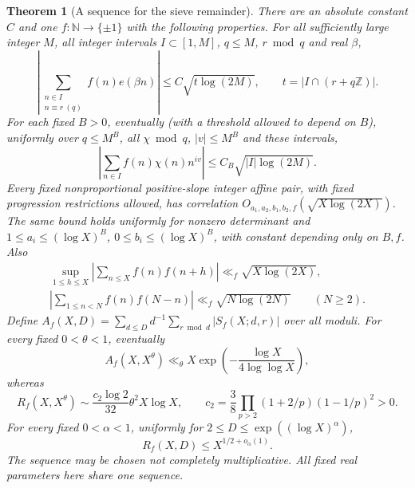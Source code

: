 \documentclass[11pt]{article}
\newtheorem{theorem}{Theorem}[section]
\theoremstyle{definition}
\newcommand{\Z}{\mathbb Z}
\newcommand{\N}{\mathbb N}
\theoremstyle{remark}
\numberwithin{equation}{section}
\begin{document}
\begin{theorem}[A sequence for the sieve remainder]\label{thm:sieve-model}
There are an absolute constant $C$ and one $f:\N\to\{\pm1\}$ with the following properties. For all sufficiently large integer $M$,
all integer intervals $I\subset[1,M]$, $q\le M$, $r\bmod q$ and real $\beta$,
\begin{equation}\label{eq:model-one}
 \left|\sum_{\substack{n\in I\\n\equiv r\ (q)}}f(n)e(\beta n)\right|
 \le C\sqrt{t\log(2M)},\qquad t=|I\cap(r+q\Z)|.
\end{equation}
For each fixed $B>0$, eventually (with a threshold allowed to depend on $B$), uniformly over $q\le M^B$, all $\chi\bmod q$, $|v|\le M^B$ and these intervals,
\begin{equation}\label{eq:model-character}
 \left|\sum_{n\in I}f(n)\chi(n)n^{iv}\right|\le C_B\sqrt{|I|\log(2M)}.
\end{equation}
Every fixed nonproportional positive-slope integer affine pair, with fixed progression restrictions allowed,
has correlation $O_{a_1,a_2,b_1,b_2,f}(\sqrt{X\log(2X)})$.
The same bound holds uniformly for nonzero determinant and
$1\le a_i\le(\log X)^B$, $0\le b_i\le(\log X)^B$, with constant depending only on $B,f$.
Also
\begin{equation}\label{eq:model-shifts}
\begin{gathered}
 \sup_{1\le h\le X}\left|\sum_{n\le X}f(n)f(n+h)\right|\ll_f\sqrt{X\log(2X)},\\
 \left|\sum_{1\le n<N}f(n)f(N-n)\right|\ll_f\sqrt{N\log(2N)}\qquad(N\ge2).
\end{gathered}
\end{equation}
Define $A_f(X,D)=\sum_{d\le D}d^{-1}\sum_{r\bmod d}|S_f(X;d,r)|$ over all moduli. For every fixed
$0<\theta<1$, eventually
\begin{equation}\label{eq:model-normalised}
 A_f(X,X^\theta)\ll_\theta X\exp\left(-\frac{\log X}{4\log\log X}\right),
\end{equation}
whereas
\begin{equation}\label{eq:model-root}
 R_f(X,X^\theta)\sim\frac{c_2\log2}{32}\theta^2X\log X,\qquad
 c_2=\frac38\prod_{p>2}(1+2/p)(1-1/p)^2>0.
\end{equation}
For every fixed $0<\alpha<1$, uniformly for $2\le D\le\exp((\log X)^\alpha)$,
\begin{equation}\label{eq:model-small}
 R_f(X,D)\le X^{1/2+o_\alpha(1)}.
\end{equation}
The sequence may be chosen not completely multiplicative. All fixed real parameters here share one sequence.
\end{theorem}
\end{document}
